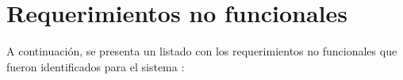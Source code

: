 \section{Requerimientos no funcionales}
A continuación, se presenta un listado con los requerimientos no funcionales \citep{RNF1} que fueron identificados para el sistema :
	
	
	
	
	

